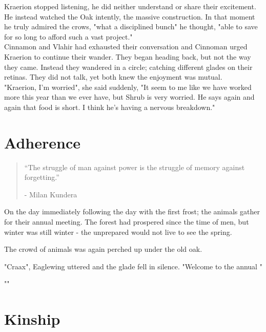 \documentclass[smalldemyvopaper,11pt,twoside,onecolumn,openright,extrafontsizes]{memoir}
\begin{document}
Kraerion stopped listening, he did neither understand or share their excitement. He instead watched the Oak intently, the massive construction. In that moment he truly admired the crows, "what a disciplined bunch" he thought, "able to save for so long to afford such a vast project." \\

Cinnamon and Vlahir had exhausted their conversation and Cinnoman urged Kraerion to continue their wander. They began heading back, but not the way they came. Instead they wandered in a circle; catching different glades on their retinas. They did not talk, yet both knew the enjoyment was mutual. \\

"Kraerion, I'm worried", she said suddenly, "It seem to me like we have worked more this year than we ever have, but Shrub is very worried. He says again and again that food is short. I think he's having a nervous breakdown."



\chapter{Adherence}

\vspace{-1.3cm}
\begin{localsize}{10}
	\begin{quote}
		“The struggle of man against power is the struggle of memory against forgetting.”
		\begin{flushright}- Milan Kundera \end{flushright}
	\end{quote} 
\end{localsize}
\vspace{1cm}

On the day immediately following the day with the first frost; the animals gather for their annual meeting. The forest had prospered since the time of men, but winter was still winter - the unprepared would not live to see the spring. 

The crowd of animals was again perched up under the old oak. 

"Craax", Eaglewing uttered and the glade fell in silence. "Welcome to the annual "


"" 

\chapter{Kinship}
\end{document}

